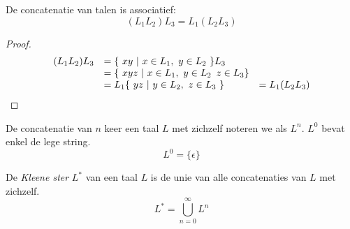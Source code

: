 \documentclass[ab.tex]{subfiles}
\begin{document}
\begin{ei}
De concatenatie van talen is associatief:
\[
(L_1L_2)L_3 = L_1(L_2L_3)
\]
\begin{proof}
\[
\begin{array}{r l l}
(L_1L_2)L_3 &= \{\ xy\ |\ x \in L_1,\ y \in L_2\ \}L_3 &\\
            &= \{\ xyz\ |\ x \in L_1,\ y \in L_2\,\ z \in L_3\} &\\
            &= L_1\{\ yz\ |\ y \in L_2,\ z \in L_3\ \} &= L_1(L_2L_3)
\end{array}
\]
\end{proof}
\end{ei}

\begin{de}
De concatenatie van $n$ keer een taal $L$ met zichzelf noteren we als $L^n$.
$L^0$ bevat enkel de lege string.
\[
L^0 = \{\epsilon\}
\]
\end{de}

\begin{de}
De \emph{Kleene ster} $L^*$ van een taal $L$ is de unie van alle concatenaties van $L$ met zichzelf.
\[
L^* = \bigcup_{n=0}^{\infty}L^n
\]
\end{de}

\begin{de}
\end{de}
\end{document}
